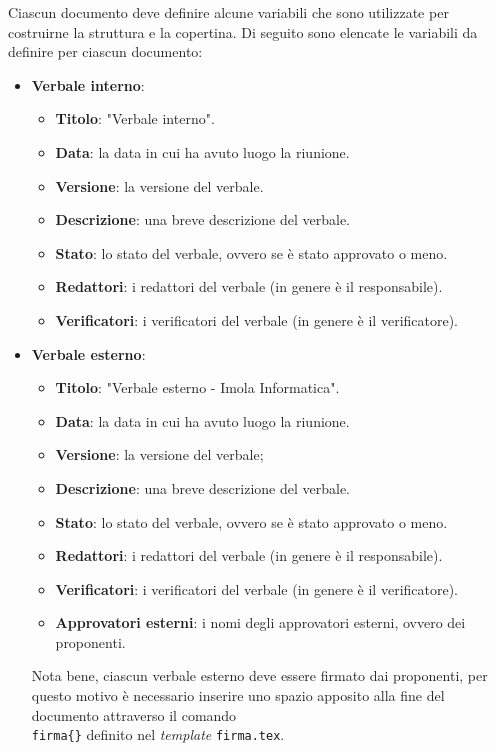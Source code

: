 Ciascun documento deve definire alcune variabili che sono utilizzate per
costruirne la struttura e la copertina. Di seguito sono elencate le variabili da
definire per ciascun documento:
\begin{itemize}
	\item \textbf{Verbale interno}:
	      \begin{itemize}
		      \item \textbf{Titolo}: "Verbale interno".
		      \item \textbf{Data}: la data in cui ha avuto luogo la riunione.
		      \item \textbf{Versione}: la versione del verbale.
		      \item \textbf{Descrizione}: una breve descrizione del verbale.
		      \item \textbf{Stato}: lo stato del verbale, ovvero se è stato
		            approvato o meno.
		      \item \textbf{Redattori}: i redattori del verbale (in genere è il
		            responsabile).
		      \item \textbf{Verificatori}: i verificatori del verbale (in genere
		            è il verificatore).
	      \end{itemize}

	\item \textbf{Verbale esterno}:
	      \begin{itemize}
		      \item \textbf{Titolo}: "Verbale esterno - Imola Informatica".
		      \item \textbf{Data}: la data in cui ha avuto luogo la riunione.
		      \item \textbf{Versione}: la versione del verbale;
		      \item \textbf{Descrizione}: una breve descrizione del verbale.
		      \item \textbf{Stato}: lo stato del verbale, ovvero se è stato
		            approvato o meno.
		      \item \textbf{Redattori}: i redattori del verbale (in genere è il
		            responsabile).
		      \item \textbf{Verificatori}: i verificatori del verbale (in genere
		            è il verificatore).
		      \item \textbf{Approvatori esterni}: i nomi degli approvatori
		            esterni, ovvero dei proponenti.
	      \end{itemize}

	      Nota bene, ciascun verbale esterno deve essere firmato dai proponenti,
	      per questo motivo è necessario inserire uno spazio apposito alla fine
	      del documento attraverso il comando \texttt{\\firma\{\}} definito nel
	      \textit{template} \texttt{firma.tex}.


\end{itemize}
